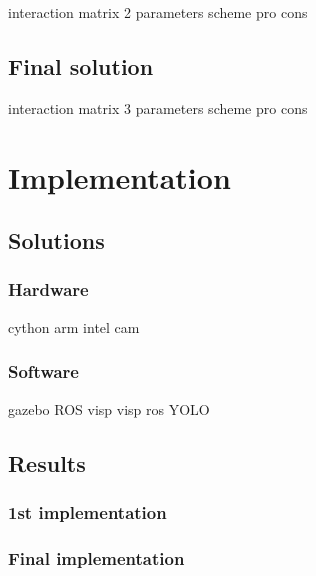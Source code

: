interaction matrix 2 parameters
scheme
pro cons

\subsection{Final solution}
interaction matrix 3 parameters
scheme
pro cons

\section{Implementation}
\label{implementation}

\subsection{Solutions}
\subsubsection{Hardware}
cython arm
intel cam

\subsubsection{Software}
gazebo
ROS
visp
visp ros
YOLO

\subsection{Results}

\subsubsection{1st implementation}


\subsubsection{Final implementation}



